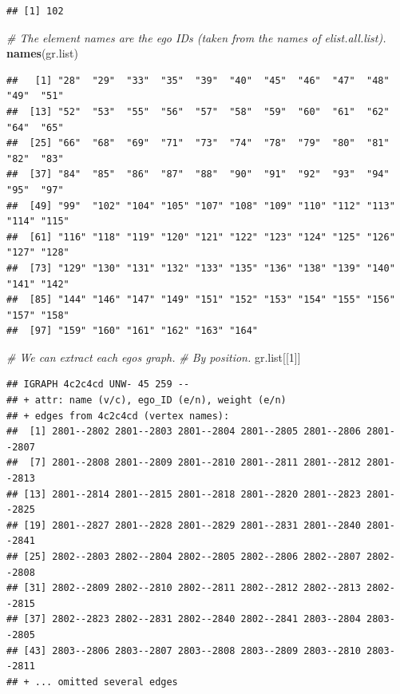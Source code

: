 \documentclass[
]{book}
\newenvironment{Shaded}{\begin{snugshade}}{\end{snugshade}}
\newcommand{\CommentTok}[1]{\textcolor[rgb]{0.56,0.35,0.01}{\textit{#1}}}
\newcommand{\DecValTok}[1]{\textcolor[rgb]{0.00,0.00,0.81}{#1}}
\newcommand{\FunctionTok}[1]{\textcolor[rgb]{0.13,0.29,0.53}{\textbf{#1}}}
\newcommand{\NormalTok}[1]{#1}
\begin{document}
\begin{verbatim}
## [1] 102
\end{verbatim}

\begin{Shaded}
\begin{Highlighting}[]
\CommentTok{\# The element names are the ego IDs (taken from the names of elist.all.list).}
\FunctionTok{names}\NormalTok{(gr.list)}
\end{Highlighting}
\end{Shaded}

\begin{verbatim}
##   [1] "28"  "29"  "33"  "35"  "39"  "40"  "45"  "46"  "47"  "48"  "49"  "51" 
##  [13] "52"  "53"  "55"  "56"  "57"  "58"  "59"  "60"  "61"  "62"  "64"  "65" 
##  [25] "66"  "68"  "69"  "71"  "73"  "74"  "78"  "79"  "80"  "81"  "82"  "83" 
##  [37] "84"  "85"  "86"  "87"  "88"  "90"  "91"  "92"  "93"  "94"  "95"  "97" 
##  [49] "99"  "102" "104" "105" "107" "108" "109" "110" "112" "113" "114" "115"
##  [61] "116" "118" "119" "120" "121" "122" "123" "124" "125" "126" "127" "128"
##  [73] "129" "130" "131" "132" "133" "135" "136" "138" "139" "140" "141" "142"
##  [85] "144" "146" "147" "149" "151" "152" "153" "154" "155" "156" "157" "158"
##  [97] "159" "160" "161" "162" "163" "164"
\end{verbatim}

\begin{Shaded}
\begin{Highlighting}[]
\CommentTok{\# We can extract each ego\textquotesingle{}s graph.}
\CommentTok{\# By position.}
\NormalTok{gr.list[[}\DecValTok{1}\NormalTok{]]}
\end{Highlighting}
\end{Shaded}

\begin{verbatim}
## IGRAPH 4c2c4cd UNW- 45 259 -- 
## + attr: name (v/c), ego_ID (e/n), weight (e/n)
## + edges from 4c2c4cd (vertex names):
##  [1] 2801--2802 2801--2803 2801--2804 2801--2805 2801--2806 2801--2807
##  [7] 2801--2808 2801--2809 2801--2810 2801--2811 2801--2812 2801--2813
## [13] 2801--2814 2801--2815 2801--2818 2801--2820 2801--2823 2801--2825
## [19] 2801--2827 2801--2828 2801--2829 2801--2831 2801--2840 2801--2841
## [25] 2802--2803 2802--2804 2802--2805 2802--2806 2802--2807 2802--2808
## [31] 2802--2809 2802--2810 2802--2811 2802--2812 2802--2813 2802--2815
## [37] 2802--2823 2802--2831 2802--2840 2802--2841 2803--2804 2803--2805
## [43] 2803--2806 2803--2807 2803--2808 2803--2809 2803--2810 2803--2811
## + ... omitted several edges
\end{verbatim}
\end{document}
